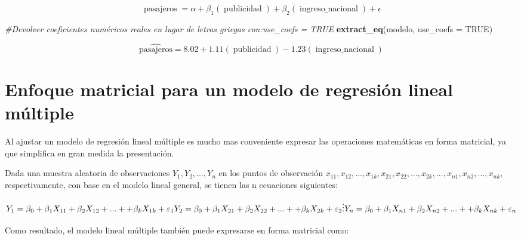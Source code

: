 \documentclass[
]{book}
\newenvironment{Shaded}{\begin{snugshade}}{\end{snugshade}}
\newcommand{\AttributeTok}[1]{\textcolor[rgb]{0.13,0.29,0.53}{#1}}
\newcommand{\CommentTok}[1]{\textcolor[rgb]{0.56,0.35,0.01}{\textit{#1}}}
\newcommand{\ConstantTok}[1]{\textcolor[rgb]{0.56,0.35,0.01}{#1}}
\newcommand{\FunctionTok}[1]{\textcolor[rgb]{0.13,0.29,0.53}{\textbf{#1}}}
\newcommand{\NormalTok}[1]{#1}
\begin{document}
\begin{equation}
\operatorname{pasajeros} = \alpha + \beta_{1}(\operatorname{publicidad}) + \beta_{2}(\operatorname{ingreso\_nacional}) + \epsilon
\end{equation}

\begin{Shaded}
\begin{Highlighting}[]
\CommentTok{\#Devolver coeficientes numéricos reales en lugar de letras griegas con:use\_coefs = TRUE}
\FunctionTok{extract\_eq}\NormalTok{(modelo, }\AttributeTok{use\_coefs =} \ConstantTok{TRUE}\NormalTok{)}
\end{Highlighting}
\end{Shaded}

\begin{equation}
\operatorname{\widehat{pasajeros}} = 8.02 + 1.11(\operatorname{publicidad}) - 1.23(\operatorname{ingreso\_nacional})
\end{equation}

\hypertarget{Enfoque-matricial}{%
\section{Enfoque matricial para un modelo de regresión lineal múltiple}\label{Enfoque-matricial}}

Al ajustar un modelo de regresión lineal múltiple es mucho mas conveniente expresar las operaciones matemáticas en forma matricial, ya que simplifica en gran medida la presentación.

Dada una muestra aleatoria de observaciones \(Y_{1},Y_{2},...,Y_{n}\) en los puntos de observación \(x_{11},x_{12},...,x_{1k},x_{21},x_{22},...,x_{2k},...,x_{n1},x_{n2},...,x_{nk}\), respectivamente, con base en el modelo lineal general, se tienen las n ecuaciones siguientes:

\[ \begin{equation}
Y_{1}=\beta _{0} + \beta _{1}X _{11} + \beta _{2}X _{12} + ... + + \beta _{k}X _{1k} + \varepsilon_{1} \\
Y_{2}=\beta _{0} + \beta _{1}X _{21} + \beta _{2}X _{22} + ... + + \beta _{k}X _{2k} + \varepsilon_{2} \\
\vdots \\
Y_{n}=\beta _{0} + \beta _{1}X _{n1} + \beta _{2}X _{n2} + ... + + \beta _{k}X _{nk} + \varepsilon_{n}
\end{equation} 
\]

Como resultado, el modelo lineal múltiple también puede expresarse en forma matricial como:
\end{document}
